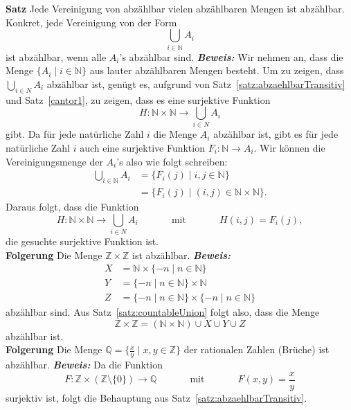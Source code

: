 \textbf{Satz }
Jede Vereinigung von abzählbar vielen abzählbaren Mengen ist abzählbar. Konkret, jede Vereinigung von der Form
\[
\bigcup_{i\in\mathbb{N}}A_i
\]
ist abzählbar, wenn alle $A_i$'s abzählbar sind.
\textbf{\textit{Beweis: }}
Wir nehmen an, dass die Menge $\{A_i\mid i\in \mathbb{N} \}$ aus lauter abzählbaren Mengen besteht. Um zu zeigen, dass $\bigcup_{i\in N}A_i$ abzählbar ist, genügt es, aufgrund von Satz~\ref{satz:abzaehlbarTransitiv} und Satz~\ref{cantor1}, zu zeigen, dass es eine surjektive Funktion
\[
H:\mathbb{N}\times\mathbb{N}\to\bigcup_{i\in N}A_i
\]
gibt. Da für jede natürliche Zahl $i$ die Menge $A_i$ abzählbar ist, gibt es für jede natürliche Zahl $i$ auch eine surjektive Funktion $F_i:\mathbb{N}\to A_i$. Wir können die Vereinigungsmenge der $A_i$'s also wie folgt schreiben:
\begin{align*}
\bigcup_{i\in \mathbb{N}}A_i&=\{F_i(j)\mid i,j\in\mathbb{N} \}\\
&=\{F_i(j)\mid (i,j)\in\mathbb{N}\times\mathbb{N} \}.
\end{align*}
Daraus folgt, dass die Funktion
\[
H:\mathbb{N}\times\mathbb{N}\to \bigcup_{i\in N}A_i\phantom{abstand}\text{mit}\phantom{abstand} H(i,j)=F_i(j),
\]
die gesuchte surjektive Funktion ist. \\
\textbf{Folgerung }
Die Menge $\mathbb{Z}\times \mathbb{Z}$ ist abzählbar.
\textbf{\textit{Beweis: }}
\begin{align*}
X&=\mathbb{N}\times\{-n\mid n\in \mathbb{N}\}\\
Y&=\{-n\mid n\in \mathbb{N}\}\times\mathbb{N} \\
Z&=\{-n\mid n\in \mathbb{N}\}\times\{-n\mid n\in \mathbb{N}\}
\end{align*}
abzählbar sind. Aus Satz~\ref{satz:countableUnion} folgt also, dass die Menge
\[
\mathbb{Z}\times\mathbb{Z}=(\mathbb{N}\times\mathbb{N})\cup X\cup Y\cup Z
\]
abzählbar ist. \\
\textbf{Folgerung }
Die Menge $\mathbb{Q}=\big\{\frac{x}{y}\mid x,y\in \mathbb{Z}\big\}$ der rationalen Zahlen (Brüche) ist abzählbar.
\textbf{\textit{Beweis: }}
Da die Funktion
\[
F:\mathbb{Z}\times(\mathbb{Z}\setminus{\{0\}})\to \mathbb{Q}\phantom{abstand}\text{mit}\phantom{abstand}F(x,y)=\frac{x}{y}
\]
surjektiv ist, folgt die Behauptung aus Satz~\ref{satz:abzaehlbarTransitiv}.\\

